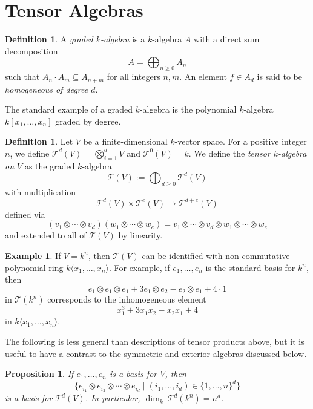 \documentclass[12pt]{article}
\theoremstyle{plain}
\newtheorem{proposition}[theorem]{Proposition}
\theoremstyle{definition}
\newtheorem{definition}[theorem]{Definition}
\newtheorem{example}[theorem]{Example}
\theoremstyle{remark}
\numberwithin{equation}{section}
\begin{document}
\section{Tensor Algebras}

\begin{definition}
A \emph{graded $k$-algebra} is a $k$-algebra $A$ with a direct sum
decomposition
\[
A = \bigoplus_{n \ge 0} A_n
\]
such that $A_n \cdot A_m \subseteq A_{n+m}$ for all integers $n,m$.
An element $f \in A_d$ is said to be \emph{homogeneous of degree $d$}.
\end{definition}

The standard example of a graded $k$-algebra is the polynomial
$k$-algebra $k[x_1,\ldots,x_n]$ graded by degree.

\begin{definition}
Let $V$ be a finite-dimensional $k$-vector space.  For a positive integer
$n$, we define $\mathcal{T}^d(V)=\bigotimes_{i=1}^d V$ and
$\mathcal{T}^0(V)=k$.  We define the \emph{tensor $k$-algebra on $V$}
as the graded $k$-algebra
\[
\mathcal{T}(V) := \bigoplus_{d \ge 0} \mathcal{T}^d(V)
\]
with multiplication
\[\mathcal{T}^d(V) \times \mathcal{T}^e(V)
\to \mathcal{T}^{d+e}(V)
\]
defined via
\[
(v_1 \otimes \cdots \otimes v_d) (w_1 \otimes \cdots \otimes w_e)
=v_1 \otimes \cdots \otimes v_d \otimes w_1 \otimes \cdots \otimes w_e
\]
and extended to all of $\mathcal{T}(V)$ by linearity. 
\end{definition}

\begin{example}
If $V=k^n$, then $\mathcal{T}(V)$ can be identified with
non-commutative polynomial ring $k\langle x_1,\ldots, x_n\rangle$.
For example, if $e_1,\ldots, e_n$ is the standard basis for $k^n$,
then
\[
e_1 \otimes e_1 \otimes e_1 + 3e_1 \otimes e_2 - e_2\otimes e_1 + 4\cdot 1
\]
in $\mathcal{T}(k^n)$
corresponds to the inhomogeneous element
\[
x_1^3 + 3x_1x_2 - x_2x_1 + 4
\]
in $k\langle x_1,\ldots, x_n\rangle$.
\end{example}

The following is less general than descriptions of tensor products
above, but it is useful to have a contrast to the symmetric and exterior
algebras discussed below.

\begin{proposition}
If $e_1, \ldots, e_n$ is a basis for $V$, then
\[
\{
e_{i_1} \otimes e_{i_2} \otimes \cdots \otimes e_{i_d}
\mid
(i_1,\ldots,i_d) \in \{1,\ldots,n\}^d
\}
\]
is a basis for $\mathcal{T}^d(V)$.
In particular, $\dim_k\ \mathcal{T}^d(k^n)=n^d$.
\end{proposition}
\end{document}
